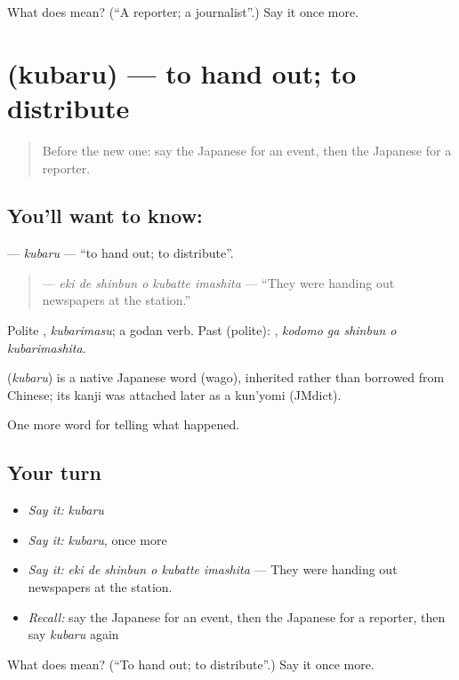\begin{tcolorbox}[breakable,colback=teal!4,colframe=teal!35!black,title={Before you move on}]
What does  mean? (\textquotedblleft{}A reporter; a journalist\textquotedblright{}.) Say it once more.
\end{tcolorbox}
\section[\texorpdfstring{\ja{くばる} (kubaru)}{くばる (kubaru)}]{ (kubaru) — to hand out; to distribute}

\label{lesson:JA-C280-kubaru}



\begin{quote}
Before the new one: say the Japanese for an event, then the Japanese for a reporter.
\end{quote}

\subsection*{You'll want to know: }
\textbf{} — \emph{kubaru} — \textquotedblleft{}to hand out; to distribute\textquotedblright{}.

\begin{quote}
\textbf{  } — \emph{eki de shinbun o kubatte imashita} — \textquotedblleft{}They were handing out newspapers at the station.\textquotedblright{}
\end{quote}

Polite \textbf{}, \emph{kubarimasu}; a godan verb. Past (polite): \textbf{  }, \emph{kodomo ga shinbun o kubarimashita}.

\begin{cousinweb}
\textbf{} (\emph{kubaru}) is a native Japanese word (wago), inherited rather than borrowed from Chinese; its kanji was attached later as a kun'yomi (JMdict).
\end{cousinweb}

\begin{grammarlens}[title={What you've built}]
One more word for telling what happened.
\end{grammarlens}

\subsection*{Your turn}
\begin{itemize}
\raggedright
  \item \emph{Say it:} \emph{kubaru}
  \item \emph{Say it:} \emph{kubaru}, once more
  \item \emph{Say it:} \emph{eki de shinbun o kubatte imashita} — They were handing out newspapers at the station.
  \item \emph{Recall:} say the Japanese for an event, then the Japanese for a reporter, then say \emph{kubaru} again
\end{itemize}

\begin{tcolorbox}[breakable,colback=teal!4,colframe=teal!35!black,title={Before you move on}]
What does  mean? (\textquotedblleft{}To hand out; to distribute\textquotedblright{}.) Say it once more.
\end{tcolorbox}
